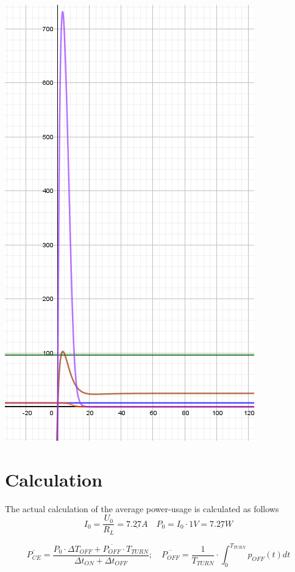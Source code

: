 \documentclass{article}
\begin{document}
    \begin{center}
        \includegraphics[scale=0.35]{images/PowerApprox.PNG}
    \end{center}
    
    \newpage
    
\section{Calculation}
    The actual calculation of the average power-usage is calculated as follows
    \begin{equation}
        I_0 = \frac{U_0}{R_L} = \underline{7.27A} \quad P_0 = I_0 \cdot 1V = \underline{7.27W}
    \end{equation}
    
    \begin{equation}
        \overline{P_{CE}} = \frac{ P_0 \cdot \Delta T_{OFF} + \overline{P_{OFF}} \cdot T_{TURN}}{\Delta t_{ON} + \Delta t_{OFF}};\quad \overline{P_{OFF}} = \frac{1}{T_{TURN}} \cdot \int_{0}^{ T_{TURN}} p_{OFF}(t)  dt 
    \end{equation}
    
\end{document}
